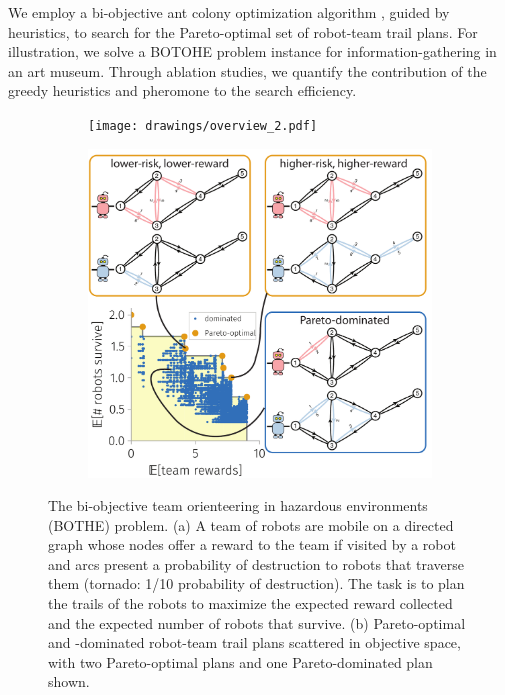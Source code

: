 \documentclass[11pt, oneside]{article}
\begin{document}
We employ a bi-objective ant colony optimization algorithm \cite{iredi2001bi}, guided by heuristics, to search for the Pareto-optimal set of robot-team trail plans.
For illustration, we solve a BOTOHE problem instance for information-gathering in an art museum.
Through ablation studies, we quantify the contribution of the greedy heuristics and pheromone to the search efficiency. 

\begin{figure}[h!]
    \centering
     \begin{subfigure}[b]{0.62\textwidth}
    	\texttt{[image: drawings/overview\_2.pdf]}
	\caption{} \label{fig:overview}
    \end{subfigure}
    \begin{subfigure}[b]{0.66\textwidth}
    	\includegraphics[width=\textwidth]{drawings/toy_pareto_front2.pdf}
	\caption{} \label{fig:pareto_optimal}
    \end{subfigure}
    \caption{
      The bi-objective team orienteering in hazardous environments (BOTHE) problem.
      (a) A team of robots are mobile on a directed graph whose 
      nodes offer a reward to the team if visited by a robot and 
      arcs present a probability of destruction to robots that traverse them (tornado: 1/10 probability of destruction). The task is to plan the trails of the robots to maximize the expected reward collected and the expected number of robots that survive.
      (b) Pareto-optimal and -dominated robot-team trail plans scattered in objective space, with two Pareto-optimal plans and one Pareto-dominated plan shown.}
\end{figure}
\end{document}

